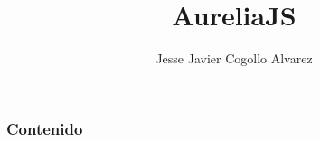 \documentclass{beamer}
\title[AureliaJS]{AureliaJS}
\author{Jesse Javier Cogollo Alvarez}
\institute[EAFIT - TalosDigital]
{
Developer by passion \\
\medskip
\textit{email: cogollo87@gmail.com} \\~\\
\textit{MedellinJS}
}
\begin{document}
\begin{frame}
\titlepage %
\end{frame}

\begin{frame}
\frametitle{Contenido} %
\tableofcontents %
\end{frame}


\end{document}
